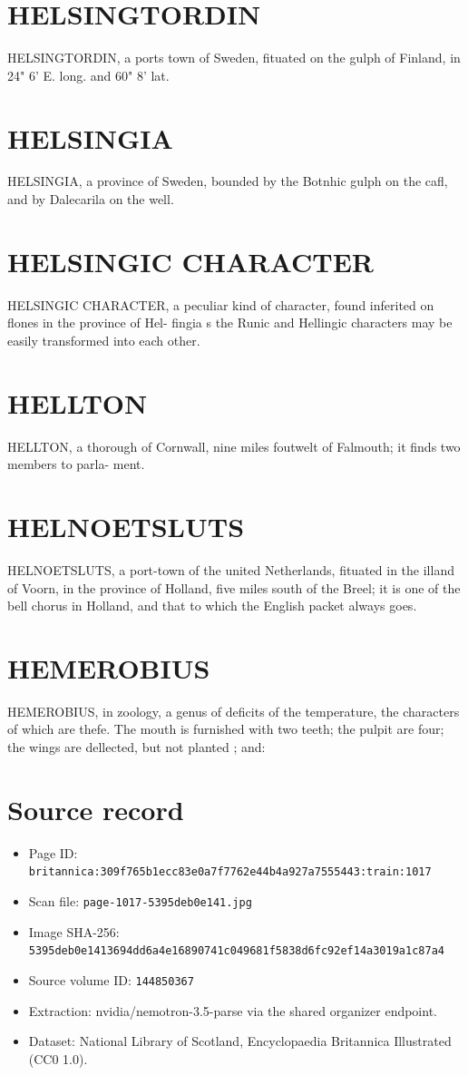 \documentclass{article}
\begin{document}
\section*{HELSINGTORDIN}
HELSINGTORDIN, a ports town of Sweden, fituated on the gulph of Finland, in 24" 6' E. long. and 60" 8' lat.

\section*{HELSINGIA}
HELSINGIA, a province of Sweden, bounded by the Botnhic gulph on the cafl, and by Dalecarila on the well.

\section*{HELSINGIC CHARACTER}
HELSINGIC CHARACTER, a peculiar kind of character, found inferited on flones in the province of Hel- fingia s the Runic and Hellingic characters may be easily transformed into each other.

\section*{HELLTON}
HELLTON, a thorough of Cornwall, nine miles foutwelt of Falmouth; it finds two members to parla- ment.

\section*{HELNOETSLUTS}
HELNOETSLUTS, a port-town of the united Netherlands, fituated in the illand of Voorn, in the province of Holland, five miles south of the Breel; it is one of the bell chorus in Holland, and that to which the English packet always goes.

\section*{HEMEROBIUS}
HEMEROBIUS, in zoology, a genus of deficits of the temperature, the characters of which are thefe. The mouth is furnished with two teeth; the pulpit are four; the wings are dellected, but not planted ; and:

\section*{Source record}
\begin{itemize}
\item Page ID: \texttt{britannica:309f765b1ecc83e0a7f7762e44b4a927a7555443:train:1017}
\item Scan file: \texttt{page-1017-5395deb0e141.jpg}
\item Image SHA-256: \texttt{5395deb0e1413694dd6a4e16890741c049681f5838d6fc92ef14a3019a1c87a4}
\item Source volume ID: \texttt{144850367}
\item Extraction: nvidia/nemotron-3.5-parse via the shared organizer endpoint.
\item Dataset: National Library of Scotland, Encyclopaedia Britannica Illustrated (CC0 1.0).
\end{itemize}
\end{document}
